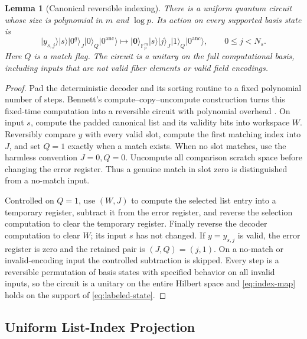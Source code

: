 \documentclass[11pt,letterpaper]{article}
\newtheorem{lemma}[theorem]{Lemma}
\theoremstyle{definition}
\newcommand{\F}{\mathbb{F}}
\newcommand{\ket}[1]{\lvert #1\rangle}
\begin{document}
\begin{lemma}[Canonical reversible indexing]
\label{lem:index-unitary}
There is a uniform quantum circuit whose size is polynomial in $m$ and $\log p$.  Its action on every supported basis state is
\begin{equation}
   \ket{y_{s,j}}\ket{s}\ket{0^q}_J\ket0_Q\ket{0^{\mathrm{anc}}}
   \longmapsto
   \ket{\mathbf 0}_{\F_p^m}\ket{s}\ket{j}_J\ket1_Q\ket{0^{\mathrm{anc}}},
   \qquad 0\le j<N_s.
   \label{eq:index-map}
\end{equation}
Here $Q$ is a match flag.  The circuit is a unitary on the full computational basis, including inputs that are not valid fiber elements or valid field encodings.
\end{lemma}

\begin{proof}
Pad the deterministic decoder and its sorting routine to a fixed polynomial number of steps.  Bennett's compute--copy--uncompute construction turns this fixed-time computation into a reversible circuit with polynomial overhead \cite{Bennett1973}.  On input $s$, compute the padded canonical list and its validity bits into workspace $W$.  Reversibly compare $y$ with every valid slot, compute the first matching index into $J$, and set $Q=1$ exactly when a match exists.  When no slot matches, use the harmless convention $J=0,Q=0$.  Uncompute all comparison scratch space before changing the error register.  Thus a genuine match in slot zero is distinguished from a no-match input.

Controlled on $Q=1$, use $(W,J)$ to compute the selected list entry into a temporary register, subtract it from the error register, and reverse the selection computation to clear the temporary register.  Finally reverse the decoder computation to clear $W$; its input $s$ has not changed.  If $y=y_{s,j}$ is valid, the error register is zero and the retained pair is $(J,Q)=(j,1)$.  On a no-match or invalid-encoding input the controlled subtraction is skipped.  Every step is a reversible permutation of basis states with specified behavior on all invalid inputs, so the circuit is a unitary on the entire Hilbert space and \cref{eq:index-map} holds on the support of \cref{eq:labeled-state}.
\end{proof}

\subsection{Uniform List-Index Projection}
\end{document}
